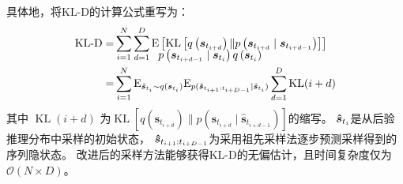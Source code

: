 具体地，将KL-D的计算公式重写为：
\begin{equation}
\begin{aligned}
\text{KL-D}=&\sum_{i=1}^{N}\sum_{d=1}^{D}\mathrm{E}\left[\operatorname{KL}\left[q\left(\boldsymbol{s}_{t_{i+d}} \right) \| p\left(\boldsymbol{s}_{t_{i+d}} \mid \boldsymbol{s}_{t_{i+d-1}}\right)\right]\right]\\[-15pt]
&\hspace{40pt}p\left(\boldsymbol{s}_{t_{i+d-1}} \mid\boldsymbol{s}_{t_{i}}\right){q\left(\boldsymbol{s}_{t_{i}} \right)}\\
=&\sum_{i=1}^{N}\mathrm{E}_{\hat{\boldsymbol{s}}_{t_i}\sim q(\boldsymbol{s}_{t_{i}})}\mathrm{E}_{p(\boldsymbol{\hat{s}}_{t_{i+1}:t_{i+D-1}}\mid \hat{\boldsymbol{s}}_{t_i})}\sum_{d=1}^{D}\operatorname{KL}(i+d)\\
\end{aligned}
\label{equ:reuse}
\end{equation}
其中 $\operatorname{KL}(i+d)$ 为$\operatorname{KL}\left[q\left(\boldsymbol{s}_{t_{i+d}} \right) \| p\left(\boldsymbol{s}_{t_{i+d}} \mid \boldsymbol{\hat s}_{t_{i+d-1}}\right)\right]$的缩写。
$\boldsymbol{\hat{s}}_{t_{i}}$是从后验推理分布中采样的初始状态，
$\boldsymbol{\hat{s}}_{t_{i+1}:t_{i+D-1}}$为采用祖先采样法逐步预测采样得到的序列隐状态。
改进后的采样方法能够获得KL-D的无偏估计，且时间复杂度仅为$\mathcal{O}(N\times D)$。
